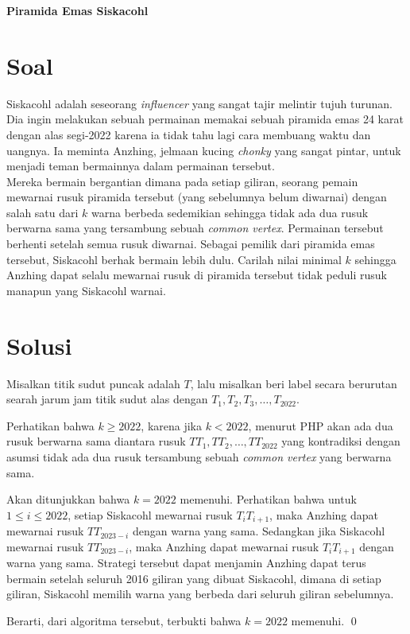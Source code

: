 \begin{center}
    \textbf{\Huge Piramida Emas Siskacohl}
\end{center}

\vspace{-3cm}
\section{Soal}
Siskacohl adalah seseorang \textit{influencer} yang sangat tajir melintir tujuh turunan. Dia ingin melakukan sebuah permainan memakai sebuah piramida emas 24 karat dengan alas segi-2022 karena ia tidak tahu lagi cara membuang waktu dan uangnya. Ia meminta Anzhing, jelmaan kucing \textit{chonky} yang sangat pintar, untuk menjadi teman bermainnya dalam permainan tersebut.
\vspace{0.2cm}
\\Mereka bermain bergantian dimana pada setiap giliran, seorang pemain mewarnai rusuk piramida tersebut (yang sebelumnya belum diwarnai) dengan salah satu dari $k$ warna berbeda sedemikian sehingga tidak ada dua rusuk berwarna sama yang tersambung sebuah \textit{common vertex}. Permainan tersebut berhenti setelah semua rusuk diwarnai. Sebagai pemilik dari piramida emas tersebut, Siskacohl berhak bermain lebih dulu. Carilah nilai minimal $k$ sehingga Anzhing dapat selalu mewarnai rusuk di piramida tersebut tidak peduli rusuk manapun yang Siskacohl warnai.

\newpage
\section{Solusi}

Misalkan titik sudut puncak adalah $T$, lalu misalkan beri label secara berurutan searah jarum jam titik sudut alas dengan $T_1,T_2,T_3,\dots,T_{2022}$.

\vspace{0.2cm}
Perhatikan bahwa $k \ge 2022$, karena jika $k < 2022$, menurut PHP akan ada dua rusuk berwarna sama diantara rusuk $TT_1,TT_2,\dots,TT_{2022}$ yang kontradiksi dengan asumsi tidak ada dua rusuk tersambung sebuah \textit{common vertex} yang berwarna sama.

\vspace{0.2cm}
Akan ditunjukkan bahwa $k = 2022$ memenuhi. Perhatikan bahwa untuk $1 \le i \le 2022$, setiap Siskacohl mewarnai rusuk $T_{i}T_{i+1}$, maka Anzhing dapat mewarnai rusuk $TT_{2023-i}$ dengan warna yang sama. Sedangkan jika Siskacohl mewarnai rusuk $TT_{2023-i}$, maka Anzhing dapat mewarnai rusuk $T_{i}T_{i+1}$ dengan warna yang sama. Strategi tersebut dapat menjamin Anzhing dapat terus bermain setelah seluruh 2016 giliran yang dibuat Siskacohl, dimana di setiap giliran, Siskacohl memilih warna yang berbeda dari seluruh giliran sebelumnya.

\vspace{0.2cm}
Berarti, dari algoritma tersebut, terbukti bahwa $k=2022$ memenuhi. \qed
